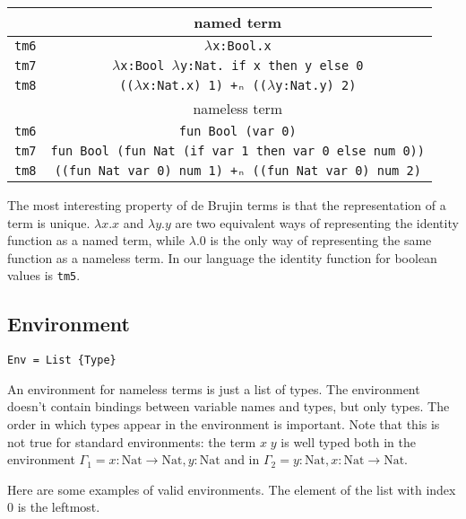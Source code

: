 \documentclass{article}
\begin{document}
\begin{center}
\begin{tabular}{ |c|c| } 
 \hline
 & named term \\
 \hline
 \texttt{tm6} & \texttt{$\lambda$x:Bool.x} \\
 \texttt{tm7} & \texttt{$\lambda$x:Bool $\lambda$y:Nat. if x then y else 0} \\
 \texttt{tm8} & \texttt{(($\lambda$x:Nat.x) 1) +ₙ (($\lambda$y:Nat.y) 2)} \\
 \hline
 \hline
 
 & nameless term \\
 \hline
 \texttt{tm6} & \texttt{fun Bool (var 0)} \\
 \texttt{tm7} & \texttt{fun Bool (fun Nat (if var 1 then var 0 else num 0))} \\
 \texttt{tm8} & \texttt{((fun Nat var 0) num 1) +ₙ ((fun Nat var 0) num 2)} \\
 
 \hline
\end{tabular}
\end{center}

The most interesting property of de Brujin terms is that the representation of a term is unique.
$\lambda x.x$ and $\lambda y.y$ are two equivalent ways of representing the identity function as a named term, while $\lambda.0$ is the only way of representing the same function as a nameless term.
In our language the identity function for boolean values is \texttt{tm5}.


\subsection{Environment}

\begin{verbatim}
Env = List {Type}
\end{verbatim}

An environment for nameless terms is just a list of types.
The environment doesn't contain bindings between variable names and types, but only types.
The order in which types appear in the environment is important.
Note that this is not true for standard environments: the term $x \; y$ is well typed both in the environment $\Gamma_1 = x:\text{Nat} \to \text{Nat}, y:\text{Nat}$ and in $\Gamma_2 = y:\text{Nat}, x:\text{Nat} \to \text{Nat}$. 

Here are some examples of valid environments.
The element of the list with index 0 is the leftmost.
\end{document}
